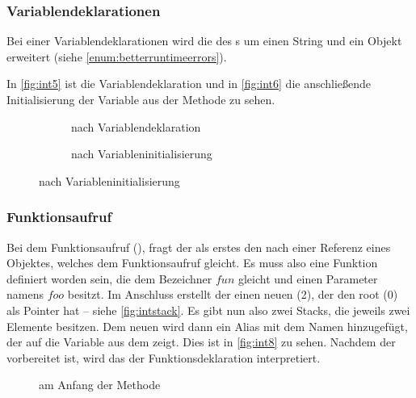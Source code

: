{    %
    \subsubsection{Variablendeklarationen}
    \label{sssec:Variablendeklarationen}
      Bei einer Variablendeklarationen wird die  des s um einen String und ein  Objekt erweitert (siehe \autoref{enum:betterruntimeerrors}).

      In \autoref{fig:int5} ist die Variablendeklaration und in \autoref{fig:int6} die anschließende Initialisierung der Variable aus der  Methode zu sehen.
      \begin{figure}[H]
        \centering
        \begin{minipage}{.45\linewidth}
          \begin{figure}[H]
            \centering
            \caption{ nach Variablendeklaration}
            \label{fig:int5}
          \end{figure}
        \end{minipage}%
        \begin{minipage}{.45\linewidth}
          \begin{figure}[H]
            \centering
            \caption{ nach Variableninitialisierung}
            \label{fig:int6}
          \end{figure}
        \end{minipage}
      \end{figure}

    \subsubsection{Funktionsaufruf}
    \label{sssec:Funktionsaufruf}
      Bei dem Funktionsaufruf (), fragt der  als erstes den  nach einer Referenz eines  Objektes, welches dem Funktionsaufruf gleicht. Es muss also eine Funktion definiert worden sein, die dem Bezeichner \myRIn$fun$ gleicht und einen Parameter namens \myRIn$foo$ besitzt. Im Anschluss erstellt der  einen neuen (2), der den root (0) als Pointer hat -- siehe \autoref{fig:intstack}. Es gibt nun also zwei Stacks, die jeweils zwei  Elemente besitzen. Dem neuen  wird dann ein Alias mit dem Namen  hinzugefügt, der auf die  Variable aus dem   zeigt. Dies ist in \autoref{fig:int8} zu sehen. Nachdem der  vorbereitet ist, wird das  der Funktionsdeklaration interpretiert.
      \begin{figure}[H]
        \centering
        \caption{ am Anfang der  Methode}
        \label{fig:int8}
      \end{figure}

}
